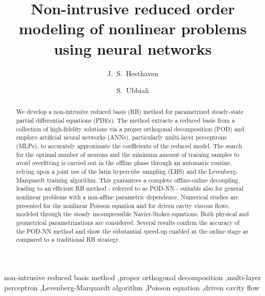 \documentclass[longtitle]{elsarticle}
\numberwithin{equation}{section}
\theoremstyle{theorem}
\theoremstyle{definition}
\theoremstyle{remark}
\theoremstyle{proposition}
\numberwithin{figure}{section}
\begin{document}
	
	\begin{frontmatter}
		\title{Non-intrusive reduced order modeling of nonlinear problems \\ using neural networks}
		
		\author[epfl]{J.~S.~Hesthaven}
		
		\author[epfl,polimi]{S.~Ubbiali}
		
		\address[epfl]{\'Ecole Polytechnique F\'ed\'erale de Lausanne (EPFL), Route Cantonale, 1015 Lausanne, Switzerland}
		\address[polimi]{Politecnico di Milano, Piazza Leonardo da Vinci 32, 20133 Milan, Italy}
		
		\begin{abstract}
			We develop a non-intrusive reduced basis (RB) method for pa\-ra\-me\-tri\-zed steady-state partial differential equations (PDEs). The method extracts a reduced basis from a collection of high-fidelity solutions via a proper orthogonal decomposition (POD) and employs artificial neural networks (ANNs), particularly multi-layer perceptrons (MLPs), to accurately approximate the coefficients of the reduced model. The search for the optimal number of neurons and the minimum amount of training samples to avoid overfitting is carried out in the offline phase through an automatic routine, relying upon a joint use of the latin hypercube sampling (LHS) and the Levenberg-Marquardt training algorithm. This guarantees a complete offline-online decoupling, leading to an efficient RB method - referred to as POD-NN - suitable also for general nonlinear problems with a non-affine parametric dependence. Numerical studies are presented for the nonlinear Poisson equation and for driven cavity viscous flows, modeled through the steady incompressible Navier-Stokes equations. Both physical and geometrical parametrizations are considered. Several results confirm the accuracy of the POD-NN method and show the substantial speed-up enabled at the online stage as compared to a traditional RB strategy.		
		\end{abstract}
		
		\begin{keyword}
			non-intrusive reduced basis method \sep proper orthogonal decomposition \sep multi-layer perceptron \sep Levenberg-Marquardt algorithm \sep Poisson equation \sep driven cavity flow
		\end{keyword}
	\end{frontmatter}
	
\end{document}
